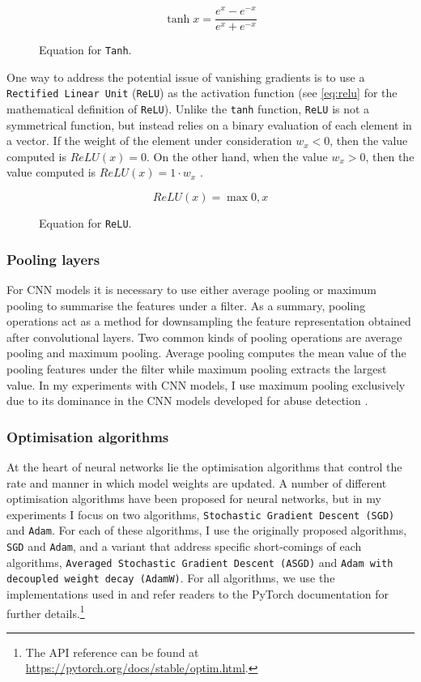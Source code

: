 \begin{figure}[h]
  \begin{equation}\label{eq:tanh}
    \tanh{x} = \dfrac{e^x - e^{-x}}{e^x + e^{-x}} 
  \end{equation}
  \caption{Equation for \texttt{Tanh}.}
\end{figure}

One way to address the potential issue of vanishing gradients is to use a \texttt{Rectified Linear Unit} (\texttt{ReLU}) as the activation function (see \cref{eq:relu} for the mathematical definition of \texttt{ReLU}). Unlike the \texttt{tanh} function, \texttt{ReLU} is not a symmetrical function, but instead relies on a binary evaluation of each element in a vector. If the weight of the element under consideration $w_x < 0$, then the value computed is $\mathit{ReLU}(x) = 0$. On the other hand, when the value $w_x > 0$, then the value computed is $\mathit{ReLU}(x) = 1 \cdot w_x$ \citep{Teuwen:2020}.

\begin{figure}[h]
  \begin{equation}\label{eq:relu}
    \mathit{ReLU (x)} = \max{0, x}
  \end{equation}
  \caption{Equation for \texttt{ReLU}.}
\end{figure}

\subsubsection{Pooling layers}\label{sub:pooling}
For CNN models it is necessary to use either average pooling or maximum pooling to summarise the features under a filter. As a summary, pooling operations act as a method for downsampling the feature representation obtained after convolutional layers. Two common kinds of pooling operations are average pooling and maximum pooling.
Average pooling computes the mean value of the pooling features under the filter while maximum pooling extracts the largest value. In my experiments with CNN models, I use maximum pooling exclusively due to its dominance in the CNN models developed for abuse detection \citep{CNN with max pooling papers}.

\subsubsection{Optimisation algorithms}

At the heart of neural networks lie the optimisation algorithms that control the rate and manner in which model weights are updated. A number of different optimisation algorithms have been proposed for neural networks, but in my experiments I focus on two algorithms, \texttt{Stochastic Gradient Descent (SGD)} and \texttt{Adam}. For each of these algorithms, I use the originally proposed algorithms, \texttt{SGD} and \texttt{Adam}, and a variant that address specific short-comings of each algorithms, \texttt{Averaged Stochastic Gradient Descent (ASGD)} and \texttt{Adam with decoupled weight decay (AdamW)}. For all algorithms, we use the implementations used in \citet{Pazske:2019} and refer readers to the PyTorch documentation for further details.\footnote{The API reference can be found at \url{https://pytorch.org/docs/stable/optim.html}.}


